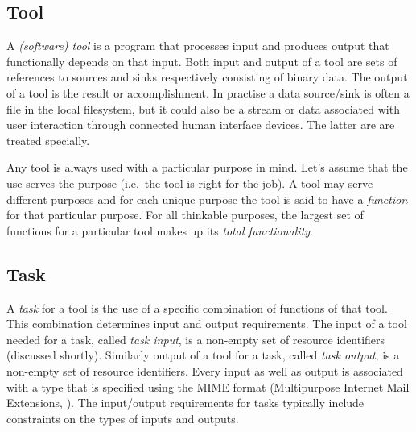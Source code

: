 \documentclass{article}
\begin{document}
  \subsection{Tool}

   A \textit{(software) tool} is a program that processes input and produces
   output that functionally depends on that input. Both input and output of a
   tool are sets of references to sources and sinks respectively consisting of
   binary data.  The output of a tool is the result or accomplishment. In
   practise a data source/sink is often a file in the local filesystem, but it
   could also be a stream or data associated with user interaction through
   connected human interface devices. The latter are are treated specially.
   
   Any tool is always used with a particular purpose in mind. Let's assume that
   the use serves the purpose (i.e.\ the tool is right for the job). A tool may
   serve different purposes and for each unique purpose the tool is said to
   have a \emph{function} for that particular purpose. For all thinkable
   purposes, the largest set of functions for a particular tool makes up its
   \textit{total functionality}.


  \subsection{Task}

   A \textit{task} for a tool is the use of a specific combination of functions
   of that tool. This combination determines input and output requirements. The
   input of a tool needed for a task, called \textit{task input}, is a
   non-empty set of resource identifiers (discussed shortly). Similarly output
   of a tool for a task, called \textit{task output}, is a non-empty set of
   resource identifiers. Every input as well as output is associated with a
   type that is specified using the MIME format (Multipurpose Internet Mail
   Extensions, \cite{rfc2822}). The input/output requirements for tasks
   typically include constraints on the types of inputs and outputs.
\end{document}
